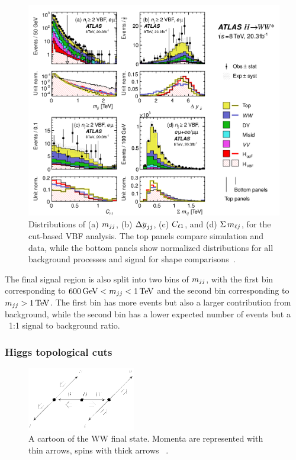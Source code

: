 \begin{figure}
  \centering
  \captionsetup{justification=centering}
  \includegraphics[width=\textwidth]{figures/VBF_vars}
  \caption{Distributions of (a) $m_{jj}$, (b) $\dyjj$, (c) $C_{\ell1}$, and (d) $\Sigma\,m_{\ell j}$, for the cut-based VBF analysis. The top panels compare simulation and data, while the bottom panels show normalized distributions for all background processes and signal for shape comparisons~\cite{WW2015}.}
  \label{fig:vbfvars}
\end{figure}

The final signal region is also split into two bins of $m_{jj}$, with the first bin corresponding to $600 \GeV < \mjj < 1 \TeV$ and the second bin corresponding to $\mjj > 1 \TeV$. The first bin has more events but also a larger contribution from background, while the second bin has a lower expected number of events but a ~1:1 signal to background ratio. 


\subsubsection{Higgs topological cuts}

\begin{figure}[h!]
  \vspace{20pt}
  \centering
  \hspace*{-32pt}
  \includegraphics[width=0.42\textwidth]{figures/ww_spins}
  \caption{A cartoon of the WW final state. Momenta are represented with thin arrows, spins with thick arrows ~\cite{WW2015}.}
  \label{fig:HWWdiagram}
\end{figure}

